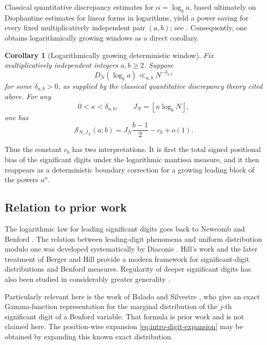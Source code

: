 \documentclass[11pt]{article}
\newtheorem{corollary}[theorem]{Corollary}
\theoremstyle{definition}
\theoremstyle{remark}
\begin{document}
Classical quantitative discrepancy estimates for
\(\alpha=\log_b a\), based ultimately on Diophantine estimates for
linear forms in logarithms, yield a power saving for every fixed
multiplicatively independent pair \((a,b)\); see
\cite{Fuchs2002,KissTichy1989I,KissTichy1989II,BakerWustholz,DrmotaTichy}.
Consequently, one obtains logarithmically growing windows as a direct
corollary.

\begin{corollary}[Logarithmically growing deterministic window]
\label{cor:intro-log-window}
Fix multiplicatively independent integers \(a,b\ge2\).
Suppose
\[
    D_N(\log_b a)\ll_{a,b}N^{-\delta_{a,b}}
\]
for some \(\delta_{a,b}>0\), as supplied by the classical quantitative
discrepancy theory cited above.  For any
\[
    0<\kappa<\delta_{a,b},
    \qquad
    J_N=\left\lfloor\kappa\log_b N\right\rfloor,
\]
one has
\begin{equation}
\boxed{
    \mathcal S_{N,J_N}(a;b)
    =
    J_N\frac{b-1}{2}
    -
    c_b
    +
    o(1).
}
\label{eq:intro-log-window}
\end{equation}
\end{corollary}

Thus the constant \(c_b\) has two interpretations.  It is first the
total signed positional bias of the significant digits under the
logarithmic mantissa measure, and it then reappears as a deterministic
boundary correction for a growing leading block of the powers \(a^n\).

\subsection{Relation to prior work}
\label{subsec:intro-prior-work}

The logarithmic law for leading significant digits goes back to
Newcomb and Benford
\cite{Newcomb1881,Benford1938}.  The relation between leading-digit
phenomena and uniform distribution modulo one was developed
systematically by Diaconis \cite{Diaconis1977}.  Hill's work
\cite{Hill1995Phenomenon,Hill1995Statistical} and the later treatment
of Berger and Hill \cite{BergerHill2011,BergerHill2015} provide a
modern framework for significant-digit distributions and Benford
measures.  Regularity of deeper significant digits has also been
studied in considerably greater generality
\cite{HillSchurger2005}.

Particularly relevant here is the work of Balado and Silvestre
\cite{BaladoSilvestre2021,BaladoSilvestre2024}, who give an exact
Gamma-function representation for the marginal distribution of the
\(j\)-th significant digit of a Benford variable.  That formula is
prior work and is not claimed here.  The position-wise expansion
\eqref{eq:intro-digit-expansion} may be obtained by expanding this
known exact distribution.
\end{document}
